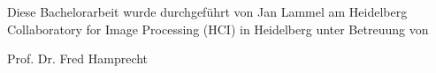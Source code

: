 \begin{titlepage}
    \begin{center}

	

		\vspace{1cm}
        
        \textbf{\myTitle}
        
        \vspace{1cm}


                

        \vfill


           


		\vspace{-3cm}
		Diese Bachelorarbeit wurde durchgeführt von Jan Lammel am  Heidelberg Collaboratory for Image Processing (HCI) in Heidelberg unter Betreuung von
		
		Prof. Dr. Fred Hamprecht               

    \end{center}  
\end{titlepage}   